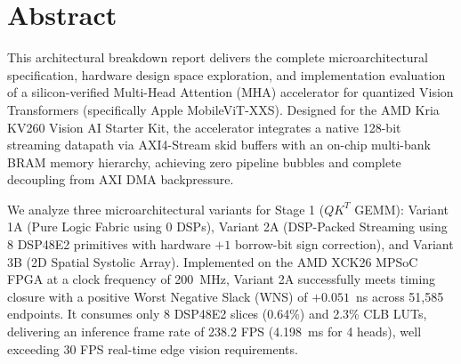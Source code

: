 \documentclass[12pt,a4paper]{report}
\begin{document}

\chapter*{Abstract}
This architectural breakdown report delivers the complete microarchitectural specification, hardware design space exploration, and implementation evaluation of a silicon-verified Multi-Head Attention (MHA) accelerator for quantized Vision Transformers (specifically Apple MobileViT-XXS). Designed for the AMD Kria KV260 Vision AI Starter Kit, the accelerator integrates a native 128-bit streaming datapath via AXI4-Stream skid buffers with an on-chip multi-bank BRAM memory hierarchy, achieving zero pipeline bubbles and complete decoupling from AXI DMA backpressure.

We analyze three microarchitectural variants for Stage 1 ($QK^T$ GEMM): Variant 1A (Pure Logic Fabric using 0 DSPs), Variant 2A (DSP-Packed Streaming using 8 DSP48E2 primitives with hardware $+1$ borrow-bit sign correction), and Variant 3B (2D Spatial Systolic Array). Implemented on the AMD XCK26 MPSoC FPGA at a clock frequency of 200~MHz, Variant 2A successfully meets timing closure with a positive Worst Negative Slack (WNS) of $+0.051$~ns across 51,585 endpoints. It consumes only 8 DSP48E2 slices (0.64\%) and 2.3\% CLB LUTs, delivering an inference frame rate of 238.2 FPS (4.198~ms for 4 heads), well exceeding 30 FPS real-time edge vision requirements.

\tableofcontents
\listoffigures
\listoftables

\clearpage
{}












\end{document}
